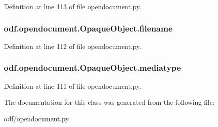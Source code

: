 Definition at line 113 of file opendocument.\+py.

\hypertarget{classodf_1_1opendocument_1_1OpaqueObject_af8f5a1a4e4daa535e72d304bfee40835}{
\subsubsection[{filename}]{\setlength{\rightskip}{0pt plus 5cm}odf.\+opendocument.\+Opaque\+Object.\+filename}}\label{classodf_1_1opendocument_1_1OpaqueObject_af8f5a1a4e4daa535e72d304bfee40835}


Definition at line 112 of file opendocument.\+py.

\hypertarget{classodf_1_1opendocument_1_1OpaqueObject_a4bbb2cc311a0c74ce3f62b2681b79d56}{
\subsubsection[{mediatype}]{\setlength{\rightskip}{0pt plus 5cm}odf.\+opendocument.\+Opaque\+Object.\+mediatype}}\label{classodf_1_1opendocument_1_1OpaqueObject_a4bbb2cc311a0c74ce3f62b2681b79d56}


Definition at line 111 of file opendocument.\+py.



The documentation for this class was generated from the following file\+:\begin{DoxyCompactItemize}
\item 
odf/\hyperlink{opendocument_8py}{opendocument.\+py}\end{DoxyCompactItemize}
